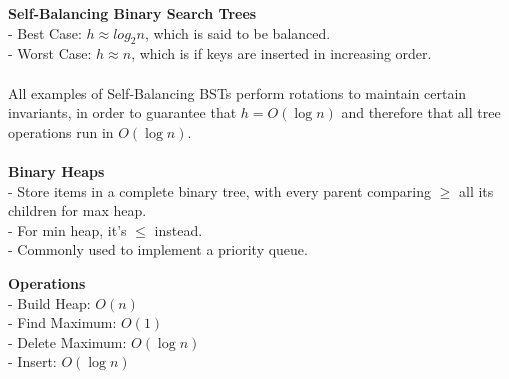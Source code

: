 \documentclass{article}
\begin{document}
\textbf{Self-Balancing Binary Search Trees} \\
- Best Case: $h \approx log_{2}n$, which is said to be balanced. \\
- Worst Case: $h \approx n$, which is if keys are inserted in increasing order.
\\\\
All examples of Self-Balancing BSTs perform rotations to maintain certain invariants, in order to guarantee that $h = O(\log n)$ and therefore that all tree operations run in $O(\log n)$.
\\\\
\textbf{Binary Heaps} \\
- Store items in a complete binary tree, with every parent comparing $\geq$ all its children for max heap. \\
- For min heap, it's $\leq$ instead. \\
- Commonly used to implement a priority queue.
\begin{tcolorbox}
    \textbf{Operations} \\
    - Build Heap: $O(n)$ \\
    - Find Maximum: $O(1)$ \\
    - Delete Maximum: $O(\log n)$ \\
    - Insert: $O(\log n)$
\end{tcolorbox}
~\\
\end{document}
